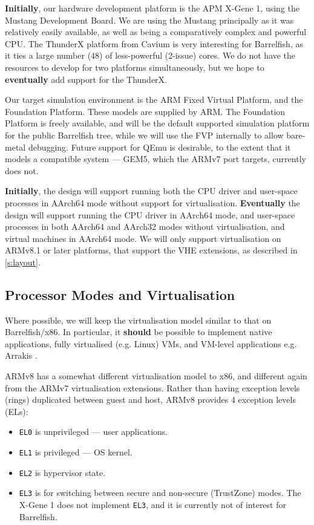 \documentclass[a4paper,twoside]{report}
\begin{document}
\textbf{Initially}, our hardware development platform is the APM X-Gene 1,
using the Mustang Development Board. We are using the Mustang principally as
it was relatively easily available, as well as being a comparatively complex
and powerful CPU. The ThunderX platform from Cavium is very interesting for
Barrelfish, as it ties a large number (48) of less-powerful (2-issue) cores.
We do not have the resources to develop for two platforms simultaneously, but
we hope to \textbf{eventually} add support for the ThunderX.

Our target simulation environment is the ARM Fixed Virtual Platform, and the
Foundation Platform. These models are supplied by ARM. The Foundation Platform
is freely available, and will be the default supported simulation platform for
the public Barrelfish tree, while we will use the FVP internally to allow
bare-metal debugging. Future support for QEmu is desirable, to the extent that
it models a compatible system --- GEM5, which the ARMv7 port targets,
currently does not.

\textbf{Initially}, the design will support running both the CPU driver and
user-space processes in AArch64 mode without support for virtualisation.
\textbf{Eventually} the design will support running the CPU driver in AArch64
mode, and user-space processes in both AArch64 and AArch32 modes without
virtualisation, and virtual machines in AArch64 mode. We will only support
virtualisation on ARMv8.1 or later platforms, that support the VHE extensions,
as described in \autoref{s:layout}.

\subsection{Processor Modes and Virtualisation}

Where possible, we will keep the virtualisation model similar to that on
Barrelfish/x86. In particular, it \textbf{should} be possible to implement
native applications, fully virtualised (e.g. Linux) VMs, and VM-level
applications e.g. Arrakis \citep{peter:osdi14}.

ARMv8 has a somewhat different virtualisation model to x86, and different
again from the ARMv7 virtualisation extensions. Rather than having exception
levels (rings) duplicated between guest and host, ARMv8 provides 4 exception
levels (ELs):

\begin{itemize}
\item \texttt{EL0} is unprivileged --- user applications.
\item \texttt{EL1} is privileged --- OS kernel.
\item \texttt{EL2} is hypervisor state.
\item \texttt{EL3} is for switching between secure and non-secure (TrustZone)
                   modes. The X-Gene 1 does not implement \texttt{EL3}, and it
                   is currently not of interest for Barrelfish.
\end{itemize}
\end{document}
